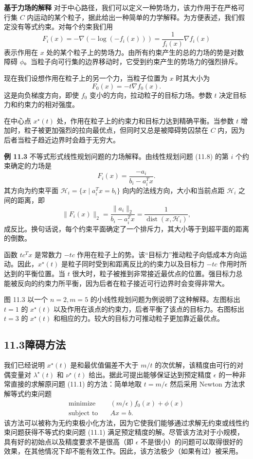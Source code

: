 \documentclass[UTF8, 12pt, fontset=fandol, oneside]{ctexart}
\begin{document}
\noindent\textbf{基于力场的解释}\quad
对于中心路径，我们可以定义一种势场力，该力作用于在严格可行集 $C$ 内运动的某个粒子，据此给出一种简单的力学解释。为方便表述，我们假定没有等式约束。对每个约束我们用
\[
F_i(x)=-\nabla(-\log(-f_i(x)))=\frac{1}{f_i(x)}\nabla f_i(x)
\]
表示作用在 $x$ 处的某个粒子上的势场力。由所有约束产生的总的力场的势是对数障碍 $\phi$。当粒子向可行集的边界移动时，它受到约束产生的势场力的强烈排斥。

现在我们设想作用在粒子上的另一个力，当粒子位置为 $x$ 时其大小为
\[
F_0(x)=-t\nabla f_0(x).
\]
这是向负梯度方向，即使 $f_0$ 变小的方向，拉动粒子的目标力场。参数 $t$ 决定目标力和约束力的相对强度。

在中心点 $x^\star(t)$ 处，作用在粒子上的约束力和目标力达到精确平衡。当参数 $t$ 增加时，粒子被更加强烈的拉向最优点，但同时又总是被障碍势囚禁在 $C$ 内，因为后者当粒子趋近边界时会趋于无穷大。

\noindent\textbf{例 11.3}\quad
不等式形式线性规划问题的力场解释。由线性规划问题 (11.8) 的第 $i$ 个约束确定的力场是
\[
F_i(x)=\frac{-a_i}{b_i-a_i^Tx}.
\]
其方向为约束平面 $\mathcal{H}_i=\{x\mid a_i^Tx=b_i\}$ 向内的法线方向，大小和当前点距 $\mathcal{H}_i$ 之间的距离，即
\[
\|F_i(x)\|_2=\frac{\|a_i\|_2}{b_i-a_i^Tx}=\frac{1}{\operatorname{dist}(x,\mathcal{H}_i)},
\]
成反比。换句话说，每个约束平面确定了一个排斥力，其大小等于到超平面的距离的倒数。

函数 $tc^Tx$ 是常数力 $-tc$ 作用在粒子上的势。该``目标力''推动粒子向低成本方向运动。因此，$x^\star(t)$ 是粒子同时受到和距离反比的约束力以及目标力 $-tc$ 作用时所达到的平衡位置。当 $t$ 很大时，粒子被推到非常接近最优点的位置。强目标力总能被反向的约束力所平衡，因为后者在粒子接近可行边界时会变得非常大。

图 11.3 以一个 $n=2,m=5$ 的小线性规划问题为例说明了这种解释。左图标出 $t=1$ 的 $x^\star(t)$ 以及作用在该点的约束力，后者平衡了该点的目标力。右图标出 $t=3$ 的 $x^\star(t)$ 和相应的力。较大的目标力可推动粒子更加靠近最优点。

\subsection*{11.3\quad 障碍方法}

我们已经说明 $x^\star(t)$ 是和最优值偏差不大于 $m/t$ 的次优解，该精度由可行的对偶变量对 $\lambda^\star(t)$ 和 $\nu^\star(t)$ 给出。据此可提出能够保证达到预定精度 $\epsilon$ 的一种非常直接的求解原问题 (11.1) 的方法：简单地取 $t=m/\epsilon$ 然后采用 Newton 方法求解等式约束问题
\[
\begin{aligned}
\text{minimize}\quad & (m/\epsilon)f_0(x)+\phi(x)\\
\text{subject to}\quad & Ax=b.
\end{aligned}
\]
该方法可以被称为无约束极小化方法，因为它使我们能够通过求解无约束或线性约束问题获得不等式约束问题 (11.1) 满足预定精度的解。尽管该方法对于小规模，具有好的初始点以及精度要求不是很高（即 $\epsilon$ 不是很小）的问题可以取得很好的效果，在其他情况下却不能有效工作。因此，该方法极少（如果有过）被采用。
\end{document}
